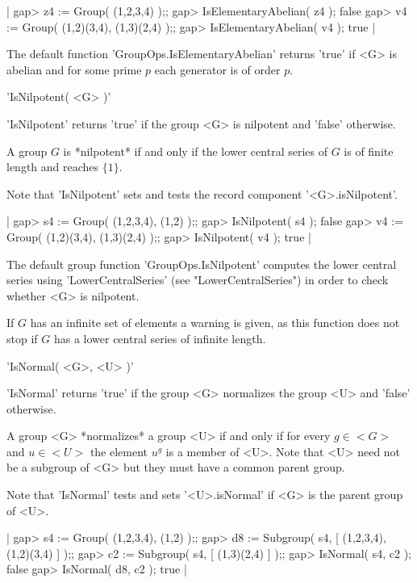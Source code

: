 |    gap> z4 := Group( (1,2,3,4) );;
    gap> IsElementaryAbelian( z4 );
    false
    gap> v4 := Group( (1,2)(3,4), (1,3)(2,4) );;
    gap> IsElementaryAbelian( v4 );
    true |

The default function 'GroupOps.IsElementaryAbelian' returns 'true' if <G>
is abelian and for some prime $p$ each generator is of order $p$.


'IsNilpotent( <G> )'

'IsNilpotent' returns  'true' if the  group <G> is  nilpotent and 'false'
otherwise.

A group $G$ is *nilpotent* if and only if the lower central series of $G$
is of finite length and reaches $\{1\}$.

Note   that 'IsNilpotent'   sets   and   tests   the   record   component
'<G>.isNilpotent'.

|    gap> s4 := Group( (1,2,3,4), (1,2) );;
    gap> IsNilpotent( s4 );
    false
    gap> v4 := Group( (1,2)(3,4), (1,3)(2,4) );;
    gap> IsNilpotent( v4 );
    true |

The default   group function  'GroupOps.IsNilpotent' computes  the  lower
central series  using 'LowerCentralSeries' (see  "LowerCentralSeries") in
order to check whether <G> is nilpotent.

If $G$  has an  infinite set  of  elements  a warning is given,   as this
function does  not stop if  $G$ has  a lower   central series of infinite
length.


'IsNormal( <G>, <U> )'

'IsNormal' returns 'true' if  the group  <G> normalizes the group <U> and
'false' otherwise.

A group <G> *normalizes* a group <U> if and  only if for every $g\in <G>$
and $u\in <U>$ the element $u^g$ is a member of <U>.  Note  that <U> need
not be a subgroup of <G> but they must have a common parent group.

Note that 'IsNormal' tests and  sets '<U>.isNormal'  if <G> is the parent
group of <U>.

|    gap> s4 := Group( (1,2,3,4), (1,2) );;
    gap> d8 := Subgroup( s4, [ (1,2,3,4), (1,2)(3,4) ] );;
    gap> c2 := Subgroup( s4, [ (1,3)(2,4) ] );;
    gap> IsNormal( s4, c2 );
    false
    gap> IsNormal( d8, c2 );
    true |

